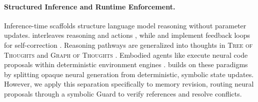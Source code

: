 \paragraph{Structured Inference and Runtime Enforcement.}
Inference-time scaffolds structure language model reasoning without parameter updates.  interleaves reasoning and actions \cite{yao_react_2023}, while  and  implement feedback loops for self-correction \cite{shinn_reflexion_2023,madaan_self-refine_2023}. Reasoning pathways are generalized into thoughts in \textsc{Tree of Thoughts} and \textsc{Graph of Thoughts} \cite{yao_tree_2023,besta_graph_2024,zhou_language_2024,luo_graph_2026}. Embodied agents like  execute neural code proposals within deterministic environment engines \cite{wang_voyager_2023}. 
\method{} builds on these paradigms by splitting opaque neural generation from deterministic, symbolic state updates. However, we apply this separation specifically to memory revision, routing neural proposals through a symbolic Guard to verify references and resolve conflicts.
